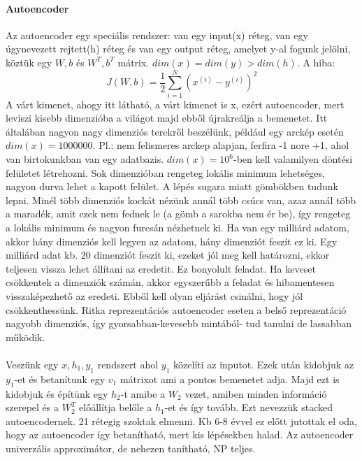 \documentclass[10pt,a4paper]{report}
\begin{document}
\paragraph{Autoencoder}
Az autoencoder egy speciális rendszer: van egy input(x) réteg, van egy úgynevezett rejtett(h) réteg és van egy output réteg, amelyet y-al fogunk jelölni, köztük egy $ W,b$ és $W^T,b^T$ mátrix. $dim(x) = dim(y) > dim(h)$. A hiba:
\begin{equation}
J(W,b) = \frac{1}{2}\sum_{i=1}^N (x^{(i)}-y^{(i)})^2
\end{equation}
A várt kimenet, ahogy itt látható, a várt kimenet is x, ezért autoencoder, mert leviszi kisebb dimenzióba a világot majd ebből újrakreálja a bemenetet. Itt általában nagyon nagy dimenziós terekről beszélünk, például egy arckép esetén $dim(x) = 1 000 000.$ Pl.: nem felismeres arckep alapjan, ferfira -1 nore +1, ahol van birtokunkban van egy adatbazis. $ dim(x) = 10^6$-ben kell valamilyen döntési felületet létrehozni. Sok dimenzióban rengeteg lokális minimum lehetséges, nagyon durva lehet a kapott felület. A lépés sugara miatt gömbökben tudunk lepni. Minél több dimenziós kockát nézünk annál több csúcs van, azaz annál több a maradék, amit ezek nem fednek le (a gömb a sarokba nem ér be), így rengeteg a lokális minimum és nagyon furcsán nézhetnek ki. Ha van egy milliárd adatom, akkor hány dimenziós kell legyen az adatom, hány dimenziót feszít ez ki. Egy milliárd adat kb. 20 dimenziót feszít ki, ezeket jól meg kell határozni, ekkor teljesen vissza lehet állítani az eredetit. Ez bonyolult feladat. Ha keveset csökkentek a dimenziók számán, akkor egyszerűbb a feladat és hibamentesen visszaképezhető az eredeti. Ebből kell olyan eljárást csinálni, hogy jól csökkenthessünk.
Ritka reprezentációs autoencoder eseten a belső reprezentáció nagyobb dimenziós, így gyorsabban-kevesebb mintából- tud tanulni de lassabban működik.
\paragraph{}
Veszünk egy $x, h_1, y_1$ rendszert ahol $y_1$ közelíti az inputot. Ezek után kidobjuk az $y_1$-et és betanítunk egy $v_1$ mátrixot ami a pontos bemenetet adja. Majd ezt is kidobjuk és építünk egy $h_2$-t amibe a $W_2$ vezet, amiben minden információ szerepel és a $W_2^T$ előállítja belőle a $h_1$-et és így tovább. Ezt nevezzük stacked autoencodernek. 21 rétegig szoktak elmenni. Kb 6-8 évvel ez előtt jutottak el oda, hogy az autoencoder így betanítható, mert kis lépésekben halad. Az autoencoder univerzális approximátor, de nehezen tanítható, NP teljes. 
\end{document}
